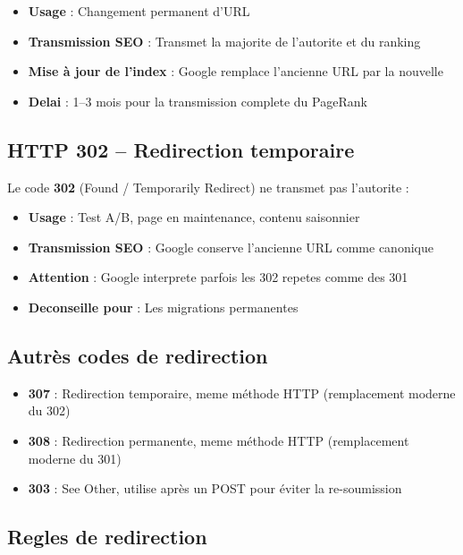 \documentclass[12pt,a4paper,twoside]{report}
\newcommand{\keyword}[1]{\textbf{\textcolor{googleblue}{#1}}}
\begin{document}
\begin{itemize}
    \item \textbf{Usage} : Changement permanent d'URL
    \item \textbf{Transmission SEO} : Transmet la majorite de l'autorite et du ranking
    \item \textbf{Mise à jour de l'index} : Google remplace l'ancienne URL par la nouvelle
    \item \textbf{Delai} : 1--3 mois pour la transmission complete du PageRank
\end{itemize}

\subsection{HTTP 302 -- Redirection temporaire}

Le code \keyword{302} (Found / Temporarily Redirect) ne transmet pas l'autorite :

\begin{itemize}
    \item \textbf{Usage} : Test A/B, page en maintenance, contenu saisonnier
    \item \textbf{Transmission SEO} : Google conserve l'ancienne URL comme canonique
    \item \textbf{Attention} : Google interprete parfois les 302 repetes comme des 301
    \item \textbf{Deconseille pour} : Les migrations permanentes
\end{itemize}

\subsection{Autrès codes de redirection}

\begin{itemize}
    \item \textbf{307} : Redirection temporaire, meme méthode HTTP (remplacement moderne du 302)
    \item \textbf{308} : Redirection permanente, meme méthode HTTP (remplacement moderne du 301)
    \item \textbf{303} : See Other, utilise après un POST pour éviter la re-soumission
\end{itemize}

\subsection{Regles de redirection}
\end{document}
